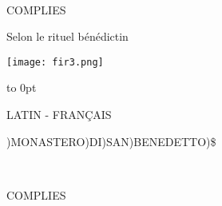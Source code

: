 \documentclass[a5paper,twoside,10pt]{book}
\begin{document}
\begin{titlepage}

\ 

\vspace*{-0.8cm}
\begin{center}
{\color{rougeliturgique}\Large \initfamily C}{\fontsize{52}{12}\selectfont OMPLIES}



\begingroup
{}\selectfont

\vspace{1cm}
\begin{huge}{Selon le rituel bénédictin}\end{huge}

\vspace*{2.2cm}

\texttt{[image: fir3.png]}

\renewcommand{\textheight}{10cm}

\vspace*{1cm}

\vbox to 0pt{
\begin{Huge}{\selectfont LATIN {\fontsize{30}{26}\selectfont -} FRANÇAIS}\end{Huge}

\vspace*{1cm}

{\fontsize{13}{13})MONASTERO)DI)SAN)BENEDETTO)\$}
\vss
}
\end{center}

\endgroup
\end{titlepage}

\newpage\null\thispagestyle{empty}\newpage

\thispagestyle{empty}
\fontsize{13}{13}\selectfont 

\ 
\vspace*{-0.3cm}

\begin{center}{\fontsize{30}{30}\selectfont COMPLIES}\end{center}

\vspace*{0.7cm}
\end{document}

